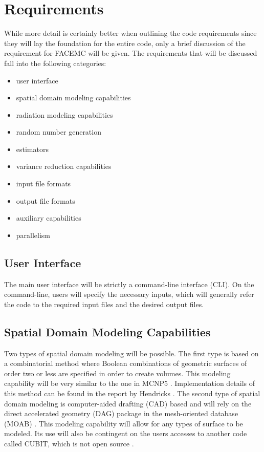 \section{Requirements}
While more detail is certainly better when outlining the code requirements since
they will lay the foundation for the entire code, only a brief discussion of
the requirement for FACEMC will be given. The requirements that will be 
discussed fall into the following categories:
\begin{itemize}
  \item user interface
  \item spatial domain modeling capabilities
  \item radiation modeling capabilities
  \item random number generation
  \item estimators
  \item variance reduction capabilities
  \item input file formats
  \item output file formats
  \item auxiliary capabilities
  \item parallelism
\end{itemize}

\subsection{User Interface}
The main user interface will be strictly a command-line interface (CLI). On the 
command-line, users will specify the necessary inputs, which will generally
refer the code to the required input files and the desired output files. 

\subsection{Spatial Domain Modeling Capabilities}
Two types of spatial domain modeling will be possible. The first type is based
on a combinatorial method where Boolean combinations of geometric surfaces of 
order two or less are specified in order to create volumes. This modeling 
capability will be very similar to the one in MCNP5
\citep{x-5_monte_carlo_team_mcnp_2003}. Implementation details of this method 
can be found in the report by Hendricks \citep{hendricks_calculation_1980}. 
The second type of spatial domain modeling is computer-aided drafting (CAD) 
based and will rely on the direct accelerated geometry (DAG) package in the 
mesh-oriented database (MOAB) 
\citep{tautges_acceleration_2009, tautges_moab:_2004}. This modeling capability 
will allow for any types of surface to be modeled. Its use will also be 
contingent on the users accesses to another code called CUBIT, which is not 
open source \citep{blacker_cubit_1994}. 

